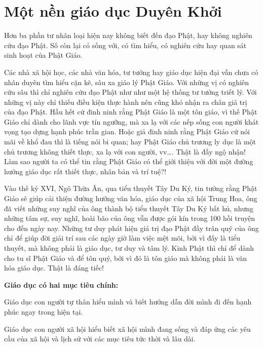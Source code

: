 \chapter{Một nền giáo dục Duyên Khởi} %
\label{cha:mot_nen_giao_duc_duyen_khoi}

Hơn ba phần tư nhân loại hiện nay không biết đến đạo Phật, hay không nghiên cứu đạo Phật. Số còn lại có sống với, có tìm hiểu, có nghiên cứu hay quan sát sinh hoạt của Phật Giáo.

Các nhà xã hội học, các nhà văn hóa, tư tưởng hay giáo dục hiện đại vẫn chưa có nhân duyên tìm hiểu cặn kẽ, sâu xa giáo lý Phật Giáo. Với những vị có nghiên cứu sâu thì chỉ nghiên cứu đạo Phật như như một hệ thống tư tưởng triết lý. Với những vị này chỉ thiếu điều kiện thực hành nên cũng khó nhận ra chân giá trị của đạo Phật. Hầu hết cứ đinh ninh rằng Phật Giáo là một tôn giáo, vì thế Phật Giáo chỉ dành cho lãnh vực tín ngưỡng, mà xa lạ với các nếp sống con người khát vọng tạo dựng hạnh phúc trần gian. Hoặc giả đinh ninh rằng Phật Giáo cứ nói mãi về khổ đau thì là tiếng nói bi quan; hay Phật Giáo chủ trương ly dục là một chủ trương không thiết thực, xa lạ với con người, vv\ldots. Thật là đầy ngộ nhận! Làm sao người ta có thể tin rằng Phật Giáo có thể giới thiệu với đời một đường hướng giáo dục rất thiết thực, nhân bản và trí tuệ?!

Vào thế kỷ XVI, Ngô Thừa Ân, qua tiểu thuyết Tây Du Ký, tin tưởng rằng Phật Giáo sẽ giúp cải thiện đường hướng văn hóa, giáo dục của xã hội Trung Hoa, ông đã viết những suy nghĩ của ông thành bộ tiểu thuyết Tây Du Ký bất hủ, nhưng những tâm sự, suy nghĩ, hoài bão của ông vẫn được gói kín trong 100 hồi truyện cho đến ngày nay. Những tư duy phát hiện giá trị đạo Phật đầy trân quý của ông chỉ để giúp đời giải trí sau các ngày giờ làm việc mệt mõi, bởi vì đấy là tiểu thuyết, mà không phải là giáo dục, tư duy và tâm lý. Kinh Phật thì chỉ để dành cho tu sĩ Phật Giáo và để tôn quý, bởi vì đó là tôn giáo mà không phải là văn hóa giáo dục. Thật là đáng tiếc!

{\bf Giáo dục có hai mục tiêu chính:}

\begin{newenumerate}

\item Giáo dục con người tự thân hiểu mình và biết hướng dẫn đời mình đi đến hạnh phúc ngay trong hiện tại.

\item Giáo dục con người xã hội hiểu biết xã hội mình đang sống và đáp ứng các yêu cầu của xã hội và lịch sử với các mục tiêu tức thời và lâu dài.
\end{newenumerate}


